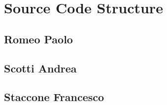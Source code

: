 \section{Source Code Structure}

\subsection{Romeo Paolo}

\subsection{Scotti Andrea} 

\subsection{Staccone Francesco} 
 
